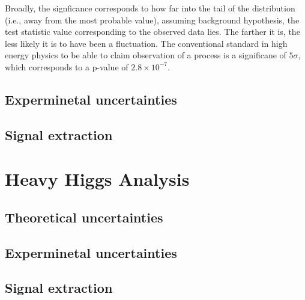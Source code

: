 Broadly, the signficance corresponds to how far into the tail of the distribution (i.e., away from the most probable value), assuming background hypothesis, the test statistic value corresponding to the observed data lies. The farther it is, the less likely it is to have been a fluctuation. The conventional standard in high energy physics to be able to claim observation of a process is a significane of $5\sigma$, which corresponds to a p-value of $2.8\times 10^{-7}$.


\subsection{Experminetal uncertainties}
\label{exp_uncert}

\subsection{Signal extraction}
\label{sig_ext}


\section{Heavy Higgs Analysis}
\label{hh_sys}

\subsection{Theoretical uncertainties}
\label{theo_uncert}

\subsection{Experminetal uncertainties}
\label{exp_uncert}

\subsection{Signal extraction}
\label{sig_ext}

%
% 
% 


